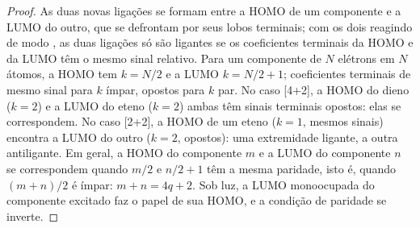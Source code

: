 \begin{proof}
As duas novas ligações se formam entre a HOMO de um componente e a LUMO do
outro, que se defrontam por seus lobos terminais; com os dois reagindo
de modo , as duas ligações só são ligantes se os coeficientes terminais da
HOMO e da LUMO têm o mesmo sinal relativo. Para um componente de $N$
elétrons em $N$ átomos, a HOMO tem $k = N/2$ e a LUMO $k = N/2 + 1$; coeficientes terminais de
mesmo sinal para $k$ ímpar, opostos para $k$ par. No caso [4+2], a HOMO do dieno ($k = 2$)
e a LUMO do eteno ($k = 2$) ambas têm sinais terminais opostos: elas se correspondem. No
caso [2+2], a HOMO de um eteno ($k = 1$, mesmos sinais) encontra a LUMO do outro
($k = 2$, opostos): uma extremidade ligante, a outra antiligante. Em geral, a HOMO do componente $m$
e a LUMO do componente $n$ se correspondem quando $m/2$ e $n/2 + 1$ têm a mesma
paridade, isto é, quando $(m + n)/2$ é ímpar: $m + n = 4q + 2$. Sob luz, a LUMO monoocupada do
componente excitado faz o papel de sua HOMO, e a condição de paridade se
inverte.
\end{proof}


